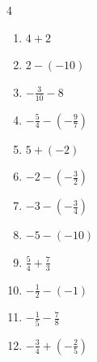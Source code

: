 \begin{multicols}{4}
\begin{enumerate}
  \item $\displaystyle 4 + 2$

        \phantom{$\displaystyle =6$}

\columnbreak %

  \item $\displaystyle 2 - \left(-10\right)$

        \phantom{$\displaystyle =12$}

  \item $\displaystyle -\frac{3}{10} - 8$


  \item $\displaystyle -\frac{5}{4} - \left(-\frac{9}{7}\right)$


  \item $\displaystyle 5 + \left(-2\right)$

        \phantom{$\displaystyle =3$}

  \item $\displaystyle -2 - \left(-\frac{3}{2}\right)$


  \item $\displaystyle -3 - \left(-\frac{3}{4}\right)$


  \item $\displaystyle -5 - \left(-10\right)$

        \phantom{$\displaystyle =5$}

  \item $\displaystyle \frac{5}{4} + \frac{7}{3}$


  \item $\displaystyle -\frac{1}{2} - \left(-1\right)$


  \item $\displaystyle -\frac{1}{5} - \frac{7}{8}$


\columnbreak %

\resetques

  \item $\displaystyle -\frac{3}{4} + \left(-\frac{2}{5}\right)$


\end{enumerate}
\end{multicols}
